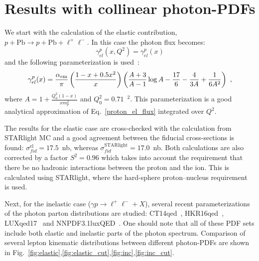 \section{Results with collinear photon-PDFs}

We start with the calculation of the elastic contribution, $p+\textrm{Pb}\rightarrow p+\textrm{Pb}+ \ell^+\ell^-$.
In this case the photon flux becomes:
\begin{equation}
\gamma^{p}_{el}(x, Q^2) = \gamma^{p}_{el}(x) 
\end{equation}
and the following parameterization is used~\cite{Budnev:1974de}:
\begin{equation}
\gamma^{p}_{el}(x)  = \frac{\alpha_{\rm em}}{\pi}
\left(
\frac{1-x+0.5x^2}{x}
\right)
\left(
\frac{A+3}{A-1}\log{A}-\frac{17}{6}-\frac{4}{3A}+\frac{1}{6A^2}
\right)~,
\end{equation}
where $A = 1+\frac{Q_0^2(1-x)}{x m_p^2}$ and $Q_0^2 = 0.71$~\GeV$^2$. This parameterization is a good analytical approximation of Eq.~\ref{proton_el_flux} integrated over $Q^2$.

The results for the elastic case are cross-checked with the calculation from STARlight MC and a good agreement between the fiducial cross-sections is found:
$\sigma_{fid}^{\textrm{el}} = 17.5$~nb, whereas $\sigma_{fid}^{\textrm{STARlight}} = 17.0$~nb.
Both calculations are also corrected by a factor $S^2=0.96$ which takes into account the requirement that there be no hadronic interactions between the proton and the ion. This is calculated using STARlight, where the hard-sphere proton--nucleus requirement~\cite{Klein:2016yzr} is used.

Next, for the inelastic case ($\gamma p\rightarrow \ell^+\ell^- + X$), several recent parameterizations of the photon parton distributions are studied: CT14qed~\cite{Schmidt:2015zda}, HKR16qed~\cite{Harland-Lang:2016kog}, LUXqed17~\cite{Manohar:2017eqh} and NNPDF3.1luxQED~\cite{Bertone:2017bme}. One should note that all of these PDF sets include both elastic and inelastic parts of the photon spectrum.
Comparison of several lepton kinematic distributions between different photon-PDFs are shown in Fig.~\ref{fig:elastic},\ref{fig:elastic_cut},\ref{fig:inc},\ref{fig:inc_cut}.

